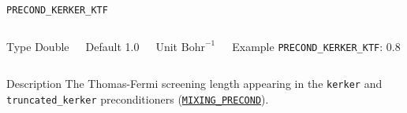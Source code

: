 \documentclass[xcolor=dvipsnames,t]{beamer}
\begin{document}
\begin{frame}[allowframebreaks]{\texttt{PRECOND\_KERKER\_KTF}} \label{PRECOND_KERKER_KTF}
\vspace*{-12pt}
\begin{columns}
\begin{block}{Type}
Double
\end{block}

\begin{block}{Default}
1.0
\end{block}

\begin{block}{Unit}
$\textrm{Bohr}^{-1}$
\end{block}

\begin{block}{Example}
\texttt{PRECOND\_KERKER\_KTF}: 0.8
\end{block}
\end{columns}

\begin{block}{Description}
The Thomas-Fermi screening length appearing in the \texttt{kerker} and \texttt{truncated\_kerker} preconditioners (\hyperlink{MIXING_PRECOND}{\texttt{MIXING\_PRECOND}}). 
\end{block}

\end{frame}
\end{document}
